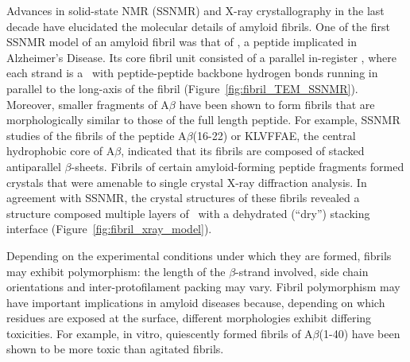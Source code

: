 
Advances in solid-state NMR (SSNMR) and X-ray crystallography in the last decade have elucidated the molecular details of amyloid fibrils. One of the first SSNMR model of an amyloid fibril was that of , a peptide implicated in Alzheimer's Disease.\cite{Petkova:2006gx}
Its core fibril unit consisted of a parallel in-register \bsheet, where each strand is a \bhairpin\ with peptide-peptide backbone hydrogen bonds running in parallel to the long-axis of the fibril (Figure~\ref{fig:fibril_TEM_SSNMR}).  Moreover, smaller fragments of A$\beta$ have been shown to form fibrils that are morphologically similar to those of the full length peptide. For example, SSNMR studies of the fibrils of the peptide A$\beta$(16-22) or KLVFFAE, the central hydrophobic core of A$\beta$, indicated that its fibrils are composed of stacked antiparallel $\beta$-sheets.\cite{Balbach:2000vf} Fibrils of certain amyloid-forming peptide fragments formed crystals that were amenable to single crystal X-ray diffraction analysis.\cite{Eisenberg:2012hm}  In agreement with SSNMR, the crystal structures of these fibrils revealed a structure composed multiple layers of \bsheet\ with a dehydrated (``dry'') stacking interface (Figure~\ref{fig:fibril_xray_model}).\cite{Sawaya:2007p4363,Eisenberg:2012hm}

Depending on the experimental conditions under which they are formed, fibrils may exhibit polymorphism: the length of the $\beta$-strand involved, side chain orientations and inter-protofilament packing may vary.\cite{Kodali:2007cz} Fibril polymorphism may have important implications in amyloid diseases because, depending on which residues are exposed at the surface, different morphologies exhibit differing toxicities. For example, in vitro, quiescently formed fibrils of A$\beta$(1-40) have been shown to be more toxic than agitated fibrils.\cite{Petkova:2005p4688} 

